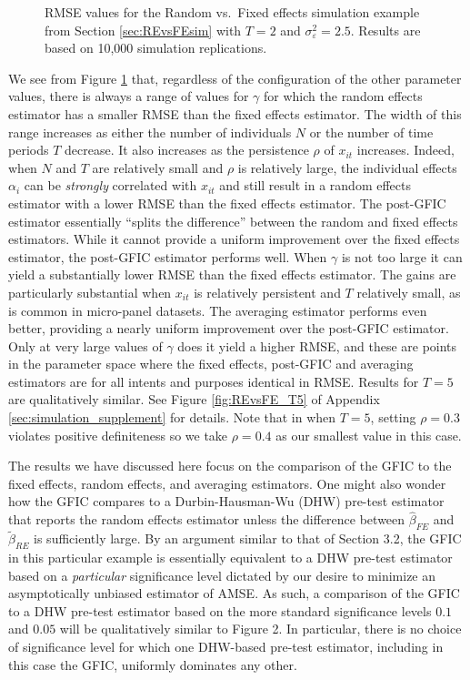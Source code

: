 \begin{figure}[htbp]
  \centering
  
  \caption{RMSE values for the Random vs.\ Fixed effects simulation example from Section \ref{sec:REvsFEsim} with $T=2$ and  $\sigma_{\varepsilon}^2 = 2.5$. Results are based on 10,000 simulation replications.}
  \label{fig:REvsFE_T2}
\end{figure}

We see from Figure \ref{fig:REvsFE_T2} that, regardless of the configuration of the other parameter values, there is always a range of values for $\gamma$ for which the random effects estimator has a smaller RMSE than the fixed effects estimator.
The width of this range increases as either the number of individuals $N$ or the number of time periods $T$ decrease.
It also increases as the persistence $\rho$ of $x_{it}$ increases.
Indeed, when $N$ and $T$ are relatively small and $\rho$ is relatively large, the individual effects $\alpha_{i}$ can be \emph{strongly} correlated with $x_{it}$ and still result in a random effects estimator with a lower RMSE than the fixed effects estimator. 
The post-GFIC estimator essentially ``splits the difference'' between the random and fixed effects estimators.
While it cannot provide a uniform improvement over the fixed effects estimator, the post-GFIC estimator performs well.
When $\gamma$ is not too large it can yield a substantially lower RMSE than the fixed effects estimator.
The gains are particularly substantial when $x_{it}$ is relatively persistent and $T$ relatively small, as is common in micro-panel datasets.
The averaging estimator performs even better, providing a nearly uniform improvement over the post-GFIC estimator.
Only at very large values of $\gamma$ does it yield a higher RMSE, and these are points in the parameter space where the fixed effects, post-GFIC and averaging estimators are for all intents and purposes identical in RMSE.
Results for $T=5$ are qualitatively similar.
See Figure \ref{fig:REvsFE_T5} of Appendix \ref{sec:simulation_supplement} for details.
Note that in when $T=5$, setting $\rho = 0.3$ violates positive definiteness so we take $\rho=0.4$ as our smallest value in this case.

The results we have discussed here focus on the comparison of the GFIC to the fixed effects, random effects, and averaging estimators.
One might also wonder how the GFIC compares to a Durbin-Hausman-Wu (DHW) pre-test estimator that reports the random effects estimator unless the difference between $\widehat{\beta}_{FE}$ and $\widetilde{\beta}_{RE}$ is sufficiently large.
By an argument similar to that of \cite{DiTraglia2016} Section 3.2, the GFIC in this particular example is essentially equivalent to a DHW pre-test estimator based on a \emph{particular} significance level dictated by our desire to minimize an asymptotically unbiased estimator of AMSE.
As such, a comparison of the GFIC to a DHW pre-test estimator based on the more standard significance levels $0.1$ and $0.05$ will be qualitatively similar to \cite{DiTraglia2016} Figure 2.
In particular, there is no choice of significance level for which one DHW-based pre-test estimator, including in this case the GFIC, uniformly dominates any other.



